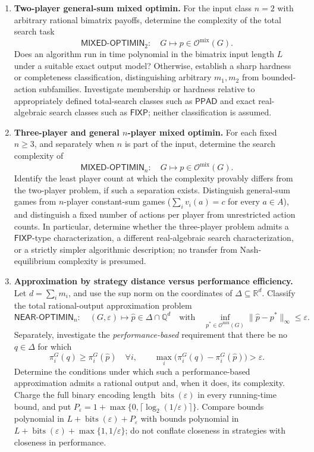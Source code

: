 \documentclass[11pt,a4paper]{article}
\begin{document}
\begin{enumerate}[label=\textbf{(\Alph*)},leftmargin=2.7em]

\item \textbf{Two-player general-sum mixed optimin.}
For the input class $n=2$ with arbitrary rational bimatrix payoffs, determine the complexity of the total search task
\[
\mathsf{MIXED\text{-}OPTIMIN}_2:\quad
G\longmapsto p\in\mathcal O^{\mathrm{mix}}(G).
\]
Does an algorithm run in time polynomial in the bimatrix input length $L$ under a suitable exact output model? Otherwise, establish a sharp hardness or completeness classification, distinguishing arbitrary $m_1,m_2$ from bounded-action subfamilies. Investigate membership or hardness relative to appropriately defined total-search classes such as $\mathsf{PPAD}$ and exact real-algebraic search classes such as $\mathsf{FIXP}$; neither classification is assumed.

\item \textbf{Three-player and general $n$-player mixed optimin.}
For each fixed $n\ge3$, and separately when $n$ is part of the input, determine the search complexity of
\[
\mathsf{MIXED\text{-}OPTIMIN}_n:\quad
G\longmapsto p\in\mathcal O^{\mathrm{mix}}(G).
\]
Identify the least player count at which the complexity provably differs from the two-player problem, if such a separation exists. Distinguish general-sum games from $n$-player constant-sum games ($\sum_i v_i(a)=c$ for every $a\in A$), and distinguish a fixed number of actions per player from unrestricted action counts. In particular, determine whether the three-player problem admits a $\mathsf{FIXP}$-type characterization, a different real-algebraic search characterization, or a strictly simpler algorithmic description; no transfer from Nash-equilibrium complexity is presumed.

\item \textbf{Approximation by strategy distance versus performance efficiency.}
Let $d=\sum_i m_i$, and use the sup norm on the coordinates of $\Delta\subseteq\mathbb R^d$. Classify the total rational-output approximation problem
\[
\mathsf{NEAR\text{-}OPTIMIN}_n:\quad
(G,\varepsilon)\longmapsto\widehat p\in\Delta\cap\mathbb Q^d
\quad\text{with}\quad
\inf_{p^*\in\mathcal O^{\mathrm{mix}}(G)}
\|\widehat p-p^*\|_\infty\le\varepsilon.
\]
Separately, investigate the \emph{performance-based} requirement that there be no $q\in\Delta$ for which
\[
\pi_i^G(q)\ge\pi_i^G(\widehat p)\quad\forall i,
\qquad \max_i\bigl(\pi_i^G(q)-\pi_i^G(\widehat p)\bigr)>\varepsilon.
\]
Determine the conditions under which such a performance-based approximation admits a rational output and, when it does, its complexity. Charge the full binary encoding length $\operatorname{bits}(\varepsilon)$ in every running-time bound, and put $P_\varepsilon=1+\max\{0,\lceil\log_2(1/\varepsilon)\rceil\}$. Compare bounds polynomial in $L+\operatorname{bits}(\varepsilon)+P_\varepsilon$ with bounds polynomial in $L+\operatorname{bits}(\varepsilon)+\max\{1,1/\varepsilon\}$; do not conflate closeness in strategies with closeness in performance.


\end{enumerate}
\end{document}
